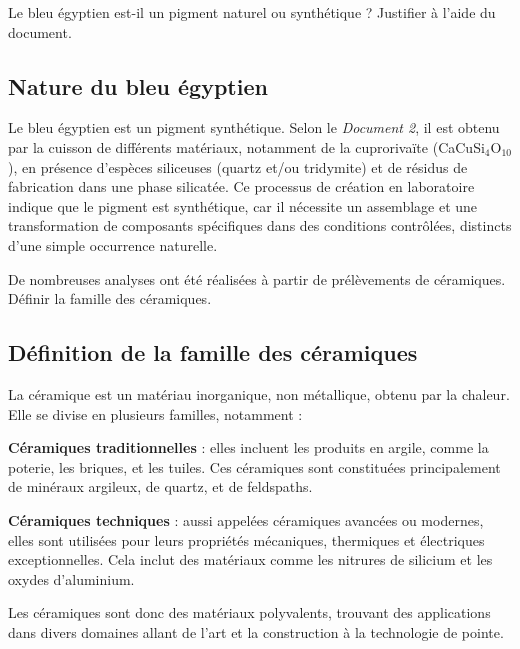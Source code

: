 \documentclass[answers]{exam}
\begin{document}
\begin{questions}

\question[0.5] Le bleu égyptien est-il un pigment naturel ou synthétique ? Justifier à l'aide du document.


\begin{solution}
\subsection*{Nature du bleu égyptien}

Le bleu égyptien est un pigment synthétique. Selon le \emph{Document 2}, il est obtenu par la cuisson de différents matériaux, notamment de la cuprorivaïte (CaCuSi\(_4\)O\(_{10}\)), en présence d'espèces siliceuses (quartz et/ou tridymite) et de résidus de fabrication dans une phase silicatée. Ce processus de création en laboratoire indique que le pigment est synthétique, car il nécessite un assemblage et une transformation de composants spécifiques dans des conditions contrôlées, distincts d'une simple occurrence naturelle.
\end{solution}

\question[0.5] De nombreuses analyses ont été réalisées à partir de prélèvements de céramiques. Définir la famille des céramiques.


\begin{solution}
\subsection*{Définition de la famille des céramiques}

La céramique est un matériau inorganique, non métallique, obtenu par la chaleur. Elle se divise en plusieurs familles, notamment :

\begin{compactitem}
    \item \textbf{Céramiques traditionnelles} : elles incluent les produits en argile, comme la poterie, les briques, et les tuiles. Ces céramiques sont constituées principalement de minéraux argileux, de quartz, et de feldspaths.
    \item \textbf{Céramiques techniques} : aussi appelées céramiques avancées ou modernes, elles sont utilisées pour leurs propriétés mécaniques, thermiques et électriques exceptionnelles. Cela inclut des matériaux comme les nitrures de silicium et les oxydes d'aluminium.
\end{compactitem}

Les céramiques sont donc des matériaux polyvalents, trouvant des applications dans divers domaines allant de l'art et la construction à la technologie de pointe.
\end{solution}


\end{questions}
\end{document}
